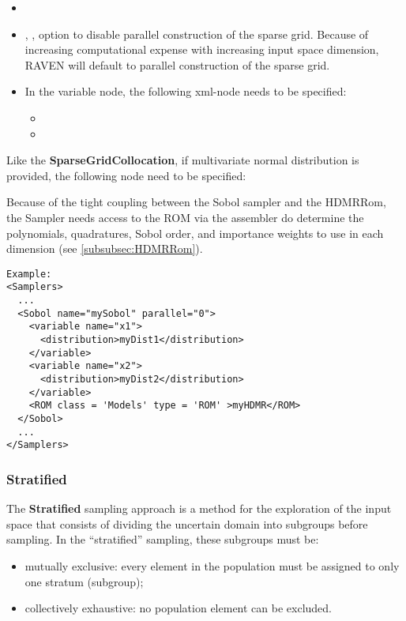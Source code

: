 \begin{itemize}
\itemsep0em
\item \nameDescription
\item {}, , option to disable parallel construction of the sparse grid.  Because of increasing computational expense with increasing input space dimension, RAVEN will default to parallel construction of the sparse grid.
\end{itemize}
\begin{itemize}
\item \variableDescription
 In the variable node, the following xml-node needs to be specified:
 \begin{itemize}
    \item \distributionDescription
    \item \functionDescription
 \end{itemize} \end{itemize}

Like the \textbf{SparseGridCollocation}, if multivariate normal distribution is provided, the following node need to be specified:

Because of the tight coupling between the Sobol sampler and the HDMRRom, the Sampler needs access to the ROM via the assembler do determine the polynomials, quadratures, Sobol order, and importance weights to use in each dimension (see \ref{subsubsec:HDMRRom}).


\footnotesize
\begin{lstlisting}[style=XML]
Example:
<Samplers>
  ...
  <Sobol name="mySobol" parallel="0">
    <variable name="x1">
      <distribution>myDist1</distribution>
    </variable>
    <variable name="x2">
      <distribution>myDist2</distribution>
    </variable>
    <ROM class = 'Models' type = 'ROM' >myHDMR</ROM>
  </Sobol>
  ...
</Samplers>
\end{lstlisting}
 \normalsize

\subsubsection{Stratified}
\label{subsubsubsec:Stratified}
The \textbf{Stratified} sampling approach is a method for the exploration of the
input space that consists of dividing the uncertain domain into subgroups before
sampling.
%
In the ``stratified'' sampling, these subgroups must be:
\begin{itemize}
 \item mutually exclusive: every element in the population must be assigned to
   only one stratum (subgroup);
 \item collectively exhaustive: no population element can be excluded.
\end{itemize}

